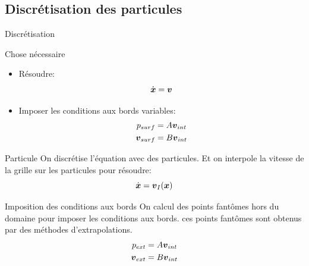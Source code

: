 \subsection{Discrétisation des particules}
\begin{frame}[<+->][shrink]{Discrétisation}

\begin{block}{Chose nécessaire}
 \begin{itemize}
  \item<0-> Résoudre:
  \begin{equation*}
   \dot{{\boldsymbol {x}}}={\boldsymbol {v}}
  \end{equation*}
  \item Imposer les conditions aux bords variables:
   \begin{align*}
 p_{surf}&=A{\boldsymbol {v}}_{int}\\
 {\boldsymbol {v}}_{surf}&=B{\boldsymbol {v}}_{int}
\end{align*}
 \end{itemize}

\end{block}

\begin{block}{Particule}
 On discrétise l'équation avec des particules.
 Et on interpole la vitesse de la grille sur les particules pour résoudre:
   \begin{equation*}
   \dot{{\boldsymbol {x}}}={\boldsymbol {v}}_{I}({\boldsymbol {x}})
  \end{equation*}
\end{block}
\begin{block}{Imposition des conditions aux bords}
On calcul des points fantômes hors du domaine pour imposer les conditions aux bords.
ces points fantômes sont obtenus par des méthodes d'extrapolations.
\begin{align*}
 p_{ext}&=A{\boldsymbol {v}}_{int}\\
 {\boldsymbol {v}}_{ext}&=B{\boldsymbol {v}}_{int}
\end{align*}
\end{block}

\end{frame}

